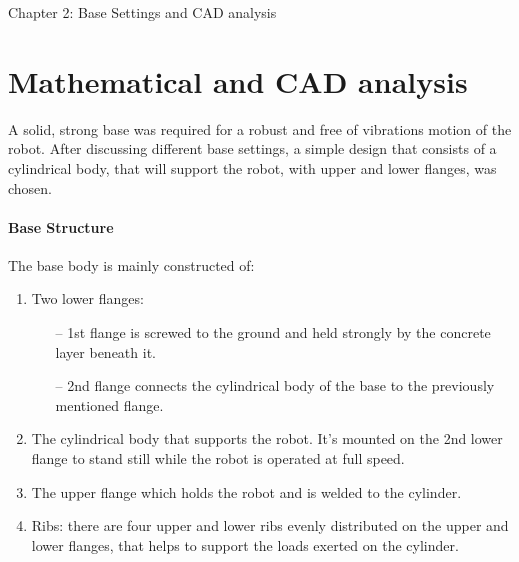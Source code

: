 \documentclass{book}
\begin{document}
	\begin{chapter}{Chapter 2: Base Settings and CAD analysis}
		\section{Mathematical and CAD analysis}
A solid, strong base was required for a robust and free of vibrations motion of the robot. After discussing different base settings, a simple design that consists of a cylindrical body, that will support the robot, with upper and lower flanges, was chosen.
\vspace{0.5 cm}
\paragraph{Base Structure}
The base body is mainly constructed of:
\begin{enumerate}
\item Two lower flanges:
	\begin{itemize}
	\item[--] 1st flange is screwed to the ground and held strongly by the concrete layer beneath it.
	\item[--] 2nd flange connects the cylindrical body of the base to the previously mentioned flange.
	\end{itemize}

\item The cylindrical body that supports the robot. It’s mounted on the 2nd lower flange to stand still while the robot is operated at full speed.

\item The upper flange which holds the robot and is welded to the cylinder.

\item Ribs: there are four upper and lower ribs evenly distributed on the upper and lower flanges, that helps to support the loads exerted on the cylinder.
\end{enumerate}


\end{chapter}
\end{document}
